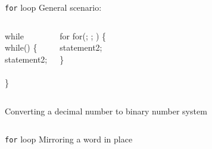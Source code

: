 \documentclass[usenames,dvipsnames,aspectratio=169]{beamer}
\begin{document}
\begin{frame}{\texttt{for} loop}
  General scenario:
  \vspace{-.3cm}
  \begin{columns}[T]
      \begin{exampleblock}{while}
        \\
        while() \{\\
          \hspace{0.5cm} statement2;\\
          \hspace{0.5cm} \\
        \}\\
      \end{exampleblock}
      \begin{exampleblock}{for}
        for(; ; ) \{\\
          \hspace{0.5cm} statement2;\\
        \}\\
      \end{exampleblock}
  \end{columns}
  \vfill
  Converting a decimal number to binary number system
  \vspace{-.3cm}
  \begin{columns}[T]
      \begin{exampleblock}{}
        \tiny
        
      \end{exampleblock}
      \begin{exampleblock}{}
        \tiny
        
      \end{exampleblock}
  \end{columns}
\end{frame}

\begin{frame}{\texttt{for} loop}
  Mirroring a word in place
  \begin{columns}[T]
    \begin{exampleblock}{}
      \tiny
      \vspace{-.3cm}
      
      \vspace{-.3cm}
    \end{exampleblock}
    \begin{exampleblock}{}
      \tiny
      \vspace{-.3cm}
      
      \vspace{-.3cm}
    \end{exampleblock}
  \end{columns}
\end{frame}
\end{document}
